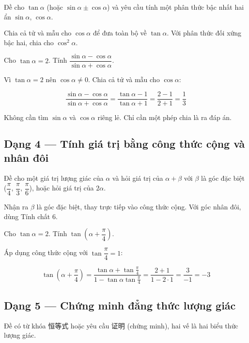 \documentclass[11pt, a4paper]{article}
\begin{document}
 Đề cho $\tan\alpha$ (hoặc $\sin\alpha \pm \cos\alpha$) và yêu cầu tính một phân thức bậc nhất hai ẩn $\sin\alpha$, $\cos\alpha$.

 Chia cả tử và mẫu cho $\cos\alpha$ để đưa toàn bộ về $\tan\alpha$. Với phân thức đối xứng bậc hai, chia cho $\cos^2\alpha$.

\begin{vidu}[{3}]
Cho $\tan\alpha = 2$. Tính $\dfrac{\sin\alpha - \cos\alpha}{\sin\alpha + \cos\alpha}$.

Vì $\tan\alpha = 2$ nên $\cos\alpha \neq 0$. Chia cả tử và mẫu cho $\cos\alpha$:

$$\frac{\sin\alpha - \cos\alpha}{\sin\alpha + \cos\alpha} = \frac{\tan\alpha - 1}{\tan\alpha + 1} = \frac{2 - 1}{2 + 1} = \frac{1}{3}$$

 Không cần tìm $\sin\alpha$ và $\cos\alpha$ riêng lẻ. Chỉ cần một phép chia là ra đáp án.

\end{vidu}
\subsection{Dạng 4 — Tính giá trị bằng công thức cộng và nhân đôi}

 Đề cho một giá trị lượng giác của $\alpha$ và hỏi giá trị của $\alpha + \beta$ với $\beta$ là góc đặc biệt ($\dfrac{\pi}{4}$, $\dfrac{\pi}{3}$, $\dfrac{\pi}{6}$), hoặc hỏi giá trị của $2\alpha$.

 Nhận ra $\beta$ là góc đặc biệt, thay trực tiếp vào công thức cộng. Với góc nhân đôi, dùng Tính chất 6.

\begin{vidu}[{4}]
Cho $\tan\alpha = 2$. Tính $\tan\!\left(\alpha + \dfrac{\pi}{4}\right)$.

Áp dụng công thức cộng với $\tan\dfrac{\pi}{4} = 1$:

$$\tan\!\left(\alpha + \frac{\pi}{4}\right) = \frac{\tan\alpha + \tan\frac{\pi}{4}}{1 - \tan\alpha\tan\frac{\pi}{4}} = \frac{2 + 1}{1 - 2 \cdot 1} = \frac{3}{-1} = -3$$

\end{vidu}
\subsection{Dạng 5 — Chứng minh đẳng thức lượng giác}

 Đề có từ khóa 恒等式 hoặc yêu cầu 证明 (chứng minh), hai vế là hai biểu thức lượng giác.
\end{document}
